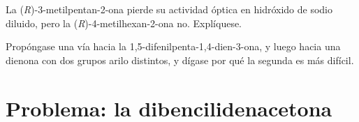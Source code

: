 \begin{exercise}[$\star\star\star$]\label{exo:b2:enolates-aldol:11}
La (\textit{R})-3-metilpentan-2-ona pierde su actividad óptica en hidróxido de sodio diluido, pero la
(\textit{R})-4-metilhexan-2-ona no. Explíquese.
\end{exercise}

\begin{exercise}[$\star\star\star$]\label{exo:b2:enolates-aldol:12}
Propóngase una vía hacia la 1,5-difenilpenta-1,4-dien-3-ona, y luego hacia una dienona con dos grupos arilo distintos,
y dígase por qué la segunda es más difícil.
\end{exercise}

\section{Problema: la dibencilidenacetona}

